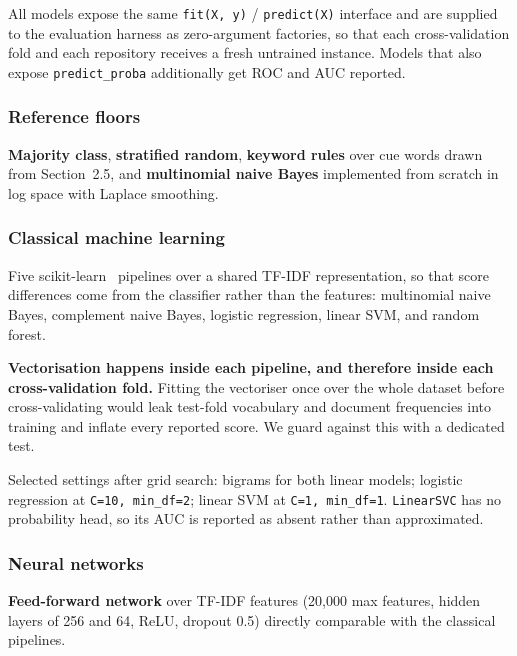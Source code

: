 All models expose the same \texttt{fit(X, y)} / \texttt{predict(X)} interface and
are supplied to the evaluation harness as zero-argument factories, so that each
cross-validation fold and each repository receives a fresh untrained instance.
Models that also expose \texttt{predict\_proba} additionally get ROC and AUC
reported.
 
\subsubsection{Reference floors}
\label{sec:reference-floors}
 
\textbf{Majority class}, \textbf{stratified random}, \textbf{keyword rules} over
cue words drawn from Section~2.5, and \textbf{multinomial naive Bayes} implemented
from scratch in log space with Laplace smoothing.
 
\subsubsection{Classical machine learning}
\label{sec:classical-ml}
 
Five scikit-learn~\cite{scikit-learn} pipelines over a shared TF-IDF representation, so that score
differences come from the classifier rather than the features: multinomial naive
Bayes, complement naive Bayes, logistic regression, linear SVM, and random
forest.
 
\textbf{Vectorisation happens inside each pipeline, and therefore inside each
cross-validation fold.} Fitting the vectoriser once over the whole dataset before
cross-validating would leak test-fold vocabulary and document frequencies into
training and inflate every reported score. We guard against this with a dedicated
test.
 
Selected settings after grid search: bigrams for both linear models; logistic
regression at \texttt{C=10, min\_df=2}; linear SVM at \texttt{C=1, min\_df=1}.
\texttt{LinearSVC} has no probability head, so its AUC is reported as absent
rather than approximated.
 
\subsubsection{Neural networks}
\label{sec:neural}
 
\textbf{Feed-forward network} over TF-IDF features (20,000 max features, hidden
layers of 256 and 64, ReLU, dropout 0.5) directly comparable with the
classical pipelines.
 
